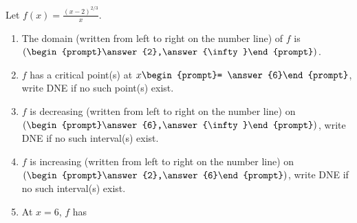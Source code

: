 \documentclass{ximera}
\author{Gregory Hartman \and Matthew Carr}
\begin{document}
\begin{exercise}







Let $f(x)=\frac{(x-2)^{2/3}}{x}$. 
\begin{enumerate}
\item		The domain (written from left to right on the number line) of $f$ is $(\begin{prompt}\answer{2},\answer{\infty}\end{prompt})$.
\item		$f$ has a critical point(s) at $x \begin{prompt}= \answer{6}\end{prompt}$, write DNE if no such point(s) exist.
\item		$f$ is decreasing (written from left to right on the number line) on $(\begin{prompt}\answer{6},\answer{\infty}\end{prompt})$, write DNE if no such interval(s) exist.
\item		$f$ is increasing (written from left to right on the number line)  on $(\begin{prompt}\answer{2},\answer{6}\end{prompt})$, write DNE if no such interval(s) exist.
\item		At $x=6$, $f$ has 
\begin{multipleChoice}
\end{multipleChoice}
\end{enumerate}

\end{exercise}
\end{document}
